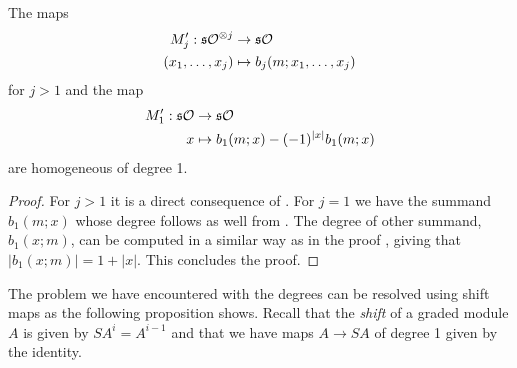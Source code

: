 \documentclass[join.tex]{subfiles}
\begin{document}
\begin{corollary}
The maps 
\begin{align*}
M_j':\mathfrak{s}{\mathcal O}^{\otimes j}&\to \mathfrak{s}{\mathcal O}\\
(x_1,\dots, x_j)&\mapsto b_j(m;x_1,\dots, x_j)
\end{align*}
for $j>1$ and the map
\begin{align*}
M_1':\mathfrak{s}{\mathcal O}&\to \mathfrak{s}{\mathcal O}\\
x&\mapsto b_1(m;x)-(-1)^{|x|}b_1(m;x)
\end{align*}
are homogeneous of degree 1. 
\end{corollary}
\begin{proof}
For $j>1$ it is a direct consequence of . For $j=1$ we have the summand $b_1(m;x)$ whose degree follows as well from . The degree of other summand, $b_1(x;m)$, can be computed in a similar way as in the proof , giving that $|b_1(x;m)|=1+|x|$. This concludes the proof.
\end{proof}

The problem we have encountered with the degrees can be resolved using shift maps as the following proposition shows. Recall that the \emph{shift} of a graded module $A$ is given by $SA^i=A^{i-1}$ and that we have maps $A\to SA$ of degree 1 given by the identity. 
\end{document}
